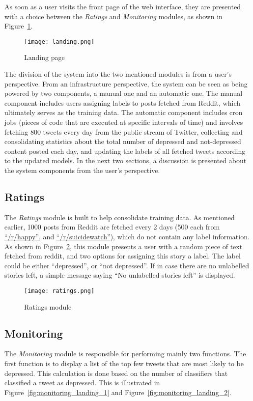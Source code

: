 As soon as a user visits the front page of the web interface, they are presented with a choice between the \emph{Ratings} and \emph{Monitoring} modules, as shown in Figure~\ref{fig:landing}.\\

\begin{figure}
    \centering
    \texttt{[image: landing.png]}
    \caption{Landing page}
    \label{fig:landing}
\end{figure}

The division of the system into the two mentioned modules is from a user's perspective. From an infrastructure perspective, the system can be seen as being powered by two components, a manual one and an automatic one. The manual component includes users assigning labels to posts fetched from Reddit, which ultimately serves as the training data. The automatic component includes cron jobs (pieces of code that are executed at specific intervals of time) and involves fetching 800 tweets every day from the public stream of Twitter, collecting and consolidating statistics about the total number of depressed and not-depressed content posted each day, and updating the labels of all fetched tweets according to the updated models. In the next two sections, a discussion is presented about the system components from the user's perspective.

\subsection{Ratings}
The \emph{Ratings} module is built to help consolidate training data. As mentioned earlier, 1000 posts from Reddit are fetched every 2 days (500 each from \href{http://www.reddit.com/r/happy}{``/r/happy''}, and \href{http://www.reddit.com/r/suicidewatch}{``/r/suicidewatch''}), which do not contain any label information. As shown in Figure~\ref{fig:ratings}, this module presents a user with a random piece of text fetched from reddit, and two options for assigning this story a label. The label could be either ``depressed'', or ``not depressed''. If in case there are no unlabelled stories left, a simple message saying ``No unlabelled stories left'' is displayed.

\begin{figure}
    \centering
    \texttt{[image: ratings.png]}
    \caption{Ratings module}
    \label{fig:ratings}
\end{figure}

\subsection{Monitoring}
The \emph{Monitoring} module is responsible for performing mainly two functions. The first function is to display a list of the top few tweets that are most likely to be depressed. This calculation is done based on the number of classifiers that classified a tweet as depressed. This is illustrated in Figure~\ref{fig:monitoring_landing_1} and Figure~\ref{fig:monitoring_landing_2}.\\

